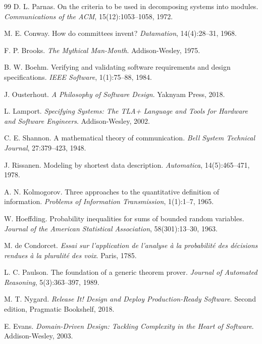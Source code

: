 \begin{thebibliography}{99}
D. L. Parnas.
\newblock On the criteria to be used in decomposing systems into modules.
\newblock \emph{Communications of the ACM}, 15(12):1053--1058, 1972.

M. E. Conway.
\newblock How do committees invent?
\newblock \emph{Datamation}, 14(4):28--31, 1968.

F. P. Brooks.
\newblock \emph{The Mythical Man-Month}.
\newblock Addison-Wesley, 1975.

B. W. Boehm.
\newblock Verifying and validating software requirements and design specifications.
\newblock \emph{IEEE Software}, 1(1):75--88, 1984.

J. Ousterhout.
\newblock \emph{A Philosophy of Software Design}.
\newblock Yaknyam Press, 2018.

L. Lamport.
\newblock \emph{Specifying Systems: The TLA+ Language and Tools for Hardware and
Software Engineers}.
\newblock Addison-Wesley, 2002.

C. E. Shannon.
\newblock A mathematical theory of communication.
\newblock \emph{Bell System Technical Journal}, 27:379--423, 1948.

J. Rissanen.
\newblock Modeling by shortest data description.
\newblock \emph{Automatica}, 14(5):465--471, 1978.

A. N. Kolmogorov.
\newblock Three approaches to the quantitative definition of information.
\newblock \emph{Problems of Information Transmission}, 1(1):1--7, 1965.

W. Hoeffding.
\newblock Probability inequalities for sums of bounded random variables.
\newblock \emph{Journal of the American Statistical Association}, 58(301):13--30,
1963.

M. de Condorcet.
\newblock \emph{Essai sur l'application de l'analyse \`a la probabilit\'e des
d\'ecisions rendues \`a la pluralit\'e des voix}.
\newblock Paris, 1785.

L. C. Paulson.
\newblock The foundation of a generic theorem prover.
\newblock \emph{Journal of Automated Reasoning}, 5(3):363--397, 1989.

M. T. Nygard.
\newblock \emph{Release It! Design and Deploy Production-Ready Software}.
\newblock Second edition, Pragmatic Bookshelf, 2018.

E. Evans.
\newblock \emph{Domain-Driven Design: Tackling Complexity in the Heart of Software}.
\newblock Addison-Wesley, 2003.


\end{thebibliography}
